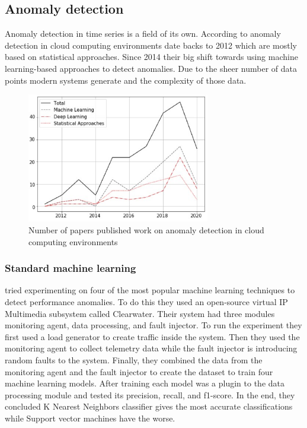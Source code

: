 \subsection{Anomaly detection}


Anomaly detection in time series is a field of its own. According to \cite{hagemann2020systematic} anomaly detection in cloud computing environments date backs to 2012 which are mostly based on statistical approaches. Since 2014 their big shift towards using machine learning-based approaches to detect anomalies. Due to the sheer number of data points modern systems generate and the complexity of those data.

\begin{figure}[H]
    \includegraphics[width=8cm]{assets/literature-review/num-of-anomaly-detection-papers.jpg}
    \caption{Number of papers published work on anomaly detection in cloud computing environments \citep{hagemann2020systematic}}
    \label{fig:num-of-anomaly-detection-paperss}
\end{figure}

\subsubsection{Standard machine learning}

\cite{du2018anomaly} tried experimenting on four of the most popular machine learning techniques to detect performance anomalies. To do this they used an open-source virtual IP Multimedia subsystem called Clearwater. Their system had three modules monitoring agent, data processing, and fault injector. To run the experiment they first used a load generator to create traffic inside the system. Then they used the monitoring agent to collect telemetry data while the fault injector is introducing random faults to the system. Finally, they combined the data from the monitoring agent and the fault injector to create the dataset to train four machine learning models. After training each model was a plugin to the data processing module and tested its precision, recall, and f1-score. In the end, they concluded K Nearest Neighbors classifier gives the most accurate classifications while Support vector machines have the worse.


